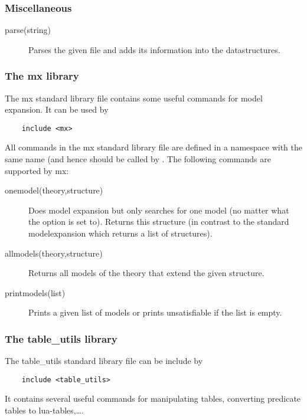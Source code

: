 \subsubsection{Miscellaneous}
\begin{description}
	
	
	\item[parse(string)]
 		Parses the given file and adds its information into the datastructures.

\end{description}





\subsubsection{The mx library}
The mx standard library file contains some useful commands for model expansion. It can be used by 
\begin{lstlisting}
	include <mx>
\end{lstlisting}
All commands in the mx standard library file are defined in a namespace with the same name (and hence should be called by .
The following commands are supported by mx:
\begin{description}
	\item[onemodel(theory,structure)]
		Does model expansion but only searches for one model (no matter what the  option is set to). Returns this structure (in contrast to the standard modelexpansion which returns a list of structures).
	\item[allmodels(theory,structure)] 
		Returns all models of the theory that extend the given structure.
	\item[printmodels(list)]
		Prints a given list of models or prints unsatisfiable if the list is empty.
\end{description}

\subsubsection{The table\_utils library}
The table\_utils standard library file can be include by 
\begin{lstlisting}
	include <table_utils>
\end{lstlisting}
It contains several useful commands for manipulating tables, converting predicate tables to lua-tables,\ldots.

